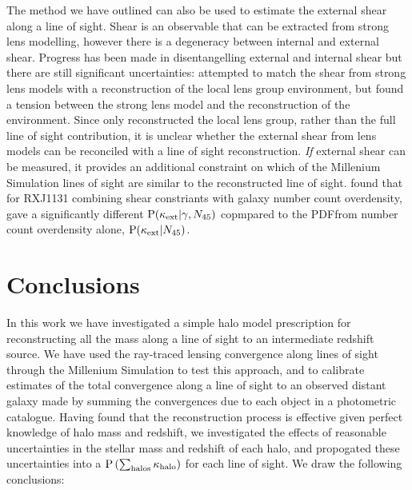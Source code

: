 \documentclass[useAMS,usenatbib]{mn2e}
\begin{document}
The method we have outlined can also be used to estimate the external shear
along a line of sight. Shear is an observable that can be extracted from
strong lens modelling, however there is a degeneracy between internal and
external shear. Progress has been made in disentangelling external and
internal shear \citep[\eg][]{xxx} but there are still significant
uncertainties: \citet{WongEtal2011} attempted to match the shear from strong
lens models with a reconstruction of the local lens group environment, but
found a tension between the strong lens model and the reconstruction of the
environment. Since \citet{WongEtal2011} only reconstructed the local lens
group, rather than the full line of sight contribution, it is unclear whether
the external shear from lens models can be reconciled with a line of sight
reconstruction. {\it If} external shear can be measured, it provides an
additional constraint on which of the Millenium Simulation lines of sight are
similar to the reconstructed line of sight. \citet{SuyuEtal2012} found that
for RXJ1131 combining shear constriants with galaxy number count overdensity,
gave a significantly different ${\rm P}(\kappa_{\rm ext}|\gamma,N_{45})$ copmpared to the
PDFfrom number count overdensity alone, ${\rm P}(\kappa_{\rm ext}|N_{45})$. 




\section{Conclusions}
\label{sec:conclude}

In this work we have investigated a simple halo model prescription for
reconstructing all the mass along a line of sight to an intermediate redshift
source. We have used the ray-traced lensing convergence along lines of sight
through the Millenium Simulation to test this approach, and to calibrate
estimates of the total convergence along a line of sight to an observed
distant galaxy made by summing the convergences due to each object in a
photometric catalogue. Having found that the reconstruction process is effective given perfect
knowledge of halo mass and redshift, we investigated the effects of reasonable
uncertainties in the stellar mass and redshift of each halo, and propogated
these uncertainties into a ${\rm P}\left(\sum_{\rm halos} \kappa_{\rm halo}\right)$ for each line of
sight. We draw the following conclusions:
\end{document}
